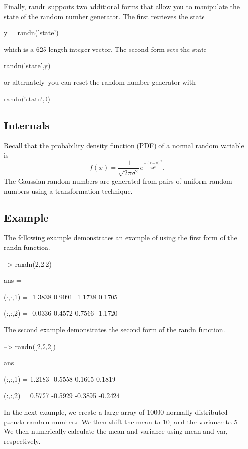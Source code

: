 Finally, {\ttfamily randn} supports two additional forms that allow you to manipulate the state of the random number generator. The first retrieves the state \begin{DoxyVerb}  y = randn('state')
\end{DoxyVerb}
 which is a 625 length integer vector. The second form sets the state \begin{DoxyVerb}  randn('state',y)
\end{DoxyVerb}
 or alternately, you can reset the random number generator with \begin{DoxyVerb}  randn('state',0)
\end{DoxyVerb}
 \hypertarget{transforms_svd_Function}{}\subsection{Internals}\label{transforms_svd_Function}
Recall that the probability density function (P\-D\-F) of a normal random variable is \[ f(x) = \frac{1}{\sqrt{2\pi \sigma^2}} e^{\frac{-(x-\mu)^2}{2\sigma^2}}. \] The Gaussian random numbers are generated from pairs of uniform random numbers using a transformation technique. \hypertarget{variables_struct_Example}{}\subsection{Example}\label{variables_struct_Example}
The following example demonstrates an example of using the first form of the {\ttfamily randn} function.


\begin{DoxyVerbInclude}
--> randn(2,2,2)

ans = 

(:,:,1) = 
   -1.3838    0.9091 
   -1.1738    0.1705 

(:,:,2) = 
   -0.0336    0.4572 
    0.7566   -1.1720 
\end{DoxyVerbInclude}


The second example demonstrates the second form of the {\ttfamily randn} function.


\begin{DoxyVerbInclude}
--> randn([2,2,2])

ans = 

(:,:,1) = 
    1.2183   -0.5558 
    0.1605    0.1819 

(:,:,2) = 
    0.5727   -0.5929 
   -0.3895   -0.2424 
\end{DoxyVerbInclude}


In the next example, we create a large array of 10000 normally distributed pseudo-\/random numbers. We then shift the mean to 10, and the variance to 5. We then numerically calculate the mean and variance using {\ttfamily mean} and {\ttfamily var}, respectively.


